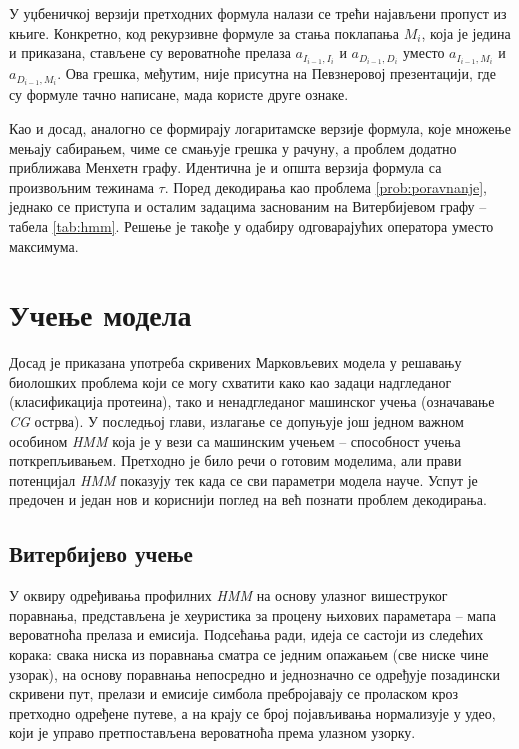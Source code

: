 \documentclass[12pt,oneside]{memoir}
\begin{document}
\begin{CJK}{UTF8}{ipxm}
У уџбеничкој верзији претходних формула налази се трећи најављени пропуст из књиге. Конкретно, код рекурзивне формуле за стања поклапања $M_i$, која је једина и приказана, стављене су вероватноће прелаза $a_{I_{i-1}, I_i}$ и $a_{D_{i-1}, D_i}$ уместо $a_{I_{i-1}, M_i}$ и $a_{D_{i-1}, M_i}$. Ова грешка, међутим, није присутна на Певзнеровој презентацији, где су формуле тачно написане, мада користе друге ознаке.

Као и досад, аналогно се формирају логаритамске верзије формула, које множење мењају сабирањем, чиме се смањује грешка у рачуну, а проблем додатно приближава Менхетн графу. Идентична је и општа верзија формула са произвољним тежинама $\tau$. Поред декодирања као проблема \ref{prob:poravnanje}, једнако се приступа и осталим задацима заснованим на Витербијевом графу -- табела \ref{tab:hmm}. Решење је такође у одабиру одговарајућих оператора уместо максимума.

\chapter{Учење модела}
Досад је приказана употреба скривених Марковљевих модела у решавању биолошких проблема који се могу схватити како као задаци надгледаног (класификација протеина), тако и ненадгледаног машинског учења (означавање \textit{CG} острва). У последњој глави, излагање се допуњује још једном важном особином \textit{HMM} која је у вези са машинским учењем -- способност учења поткрепљивањем. Претходно је било речи о готовим моделима, али прави потенцијал \textit{HMM} показују тек када се сви параметри модела науче. Успут је предочен и један нов и кориснији поглед на већ познати проблем декодирања.

\section{Витербијево учење}
У оквиру одређивања профилних \textit{HMM} на основу улазног вишеструког поравнања, представљена је хеуристика за процену њихових параметара -- мапа вероватноћа прелаза и емисија. Подсећања ради, идеја се састоји из следећих корака: свака ниска из поравнања сматра се једним опажањем (све ниске чине узорак), на основу поравнања непосредно и једнозначно се одређује позадински скривени пут, прелази и емисије симбола пребројавају се проласком кроз претходно одређене путеве, а на крају се број појављивања нормализује у удео, који је управо претпостављена вероватноћа према улазном узорку.


\end{CJK}
\end{document}
